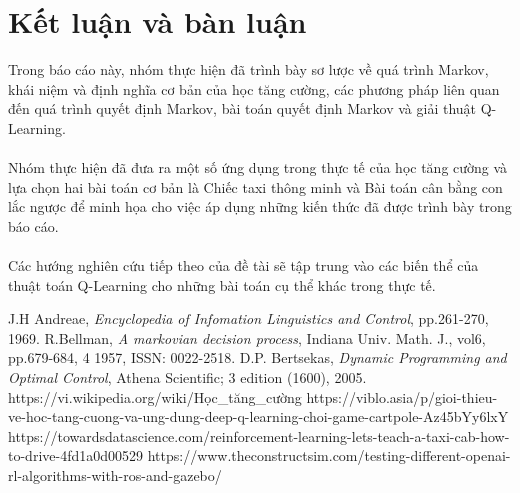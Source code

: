 \documentclass[12pt,a4paper]{report}
\begin{document}
\chapter{Kết luận và bàn luận}
Trong báo cáo này, nhóm thực hiện đã trình bày sơ lược về quá trình Markov, khái niệm và định nghĩa cơ bản của học tăng cường, các phương pháp liên quan đến quá trình quyết
định Markov, bài toán quyết định Markov và giải thuật Q-Learning.\\\\ Nhóm thực hiện đã đưa ra một số ứng dụng trong thực tế của học tăng cường và lựa chọn hai bài toán cơ bản là Chiếc
taxi thông minh và Bài toán cân bằng con lắc ngược để minh họa cho việc áp dụng những
kiến thức đã được trình bày trong báo cáo.\\\\
Các hướng nghiên cứu tiếp theo của đề tài sẽ tập trung vào các biến thể của thuật toán
Q-Learning cho những bài toán cụ thể khác trong thực tế.

\begin{thebibliography}{}
	 J.H Andreae, \textit{Encyclopedia of Infomation Linguistics and Control}, pp.261-270, 1969.
	 R.Bellman, \textit{A markovian decision process}, Indiana Univ. Math. J., vol6, pp.679-684, 4 1957, ISSN: 0022-2518.
	 D.P. Bertsekas, \textit{Dynamic Programming and Optimal Control}, Athena Scientific; 3 edition (1600), 2005.
	https://vi.wikipedia.org/wiki/Học\_tăng\_cường
	https://viblo.asia/p/gioi-thieu-ve-hoc-tang-cuong-va-ung-dung-deep-q-learning-choi-game-cartpole-Az45bYy6lxY
	https://towardsdatascience.com/reinforcement-learning-lets-teach-a-taxi-cab-how-to-drive-4fd1a0d00529
	https://www.theconstructsim.com/testing-different-openai-rl-algorithms-with-ros-and-gazebo/
\end{thebibliography}
\end{document}
